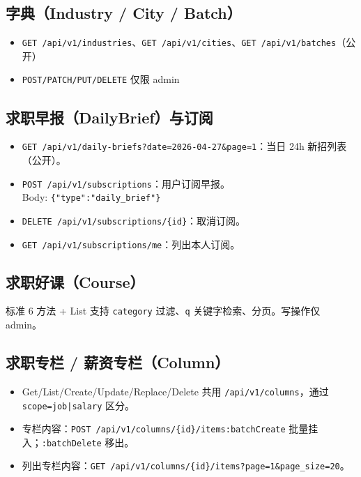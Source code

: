 \documentclass[11pt,a4paper]{ctexart}
\begin{document}
\subsection{字典（Industry / City / Batch）}
\begin{itemize}[leftmargin=2em]
    \item \texttt{GET /api/v1/industries}、\texttt{GET /api/v1/cities}、\texttt{GET /api/v1/batches}（公开）
    \item \texttt{POST/PATCH/PUT/DELETE} 仅限 admin
\end{itemize}

\subsection{求职早报（DailyBrief）与订阅}
\begin{itemize}[leftmargin=2em]
    \item \texttt{GET /api/v1/daily-briefs?date=2026-04-27\&page=1}：当日 24h 新招列表（公开）。
    \item \texttt{POST /api/v1/subscriptions}：用户订阅早报。\\
    Body: \texttt{\{"type":"daily\_brief"\}}
    \item \texttt{DELETE /api/v1/subscriptions/\{id\}}：取消订阅。
    \item \texttt{GET /api/v1/subscriptions/me}：列出本人订阅。
\end{itemize}

\subsection{求职好课（Course）}
标准 6 方法 + List 支持 \texttt{category} 过滤、\texttt{q} 关键字检索、分页。写操作仅 admin。

\subsection{求职专栏 / 薪资专栏（Column）}
\begin{itemize}[leftmargin=2em]
    \item Get/List/Create/Update/Replace/Delete 共用 \texttt{/api/v1/columns}，通过 \texttt{scope=job|salary} 区分。
    \item 专栏内容：\texttt{POST /api/v1/columns/\{id\}/items:batchCreate} 批量挂入；\texttt{:batchDelete} 移出。
    \item 列出专栏内容：\texttt{GET /api/v1/columns/\{id\}/items?page=1\&page\_size=20}。
\end{itemize}
\end{document}
